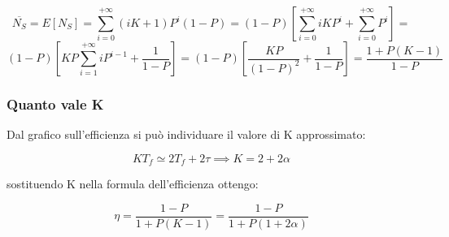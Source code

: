 \begin{equation*}
\overline{N_S} = E[N_S] = \sum_{i=0}^{+\infty} (iK + 1) P^i (1-P) = (1-P) \left[ \sum_{i=0}^{+\infty} iK P^i + \sum_{i=0}^{+\infty} P^i \right] =
\end{equation*}
\begin{equation*}
(1-P) \left[ KP \sum_{i=1}^{+\infty} i P^{i-1} + \frac{1}{1-P} \right] = (1-P) \left[ \frac{KP}{(1-P)^2} + \frac{1}{1-P} \right] = \frac{1 + P(K-1)}{1-P}
\end{equation*}

\subsubsection{Quanto vale K}
Dal grafico sull'efficienza si può individuare il valore di K approssimato:

\begin{equation}
KT_f \simeq 2T_f + 2\tau \implies K = 2 + 2\alpha
\end{equation}

sostituendo K nella formula dell'efficienza ottengo:

\begin{equation}
\eta = \frac{1-P}{1 + P(K-1)} = \frac{1-P}{1 + P(1 + 2\alpha)}
\end{equation}


\newpage


